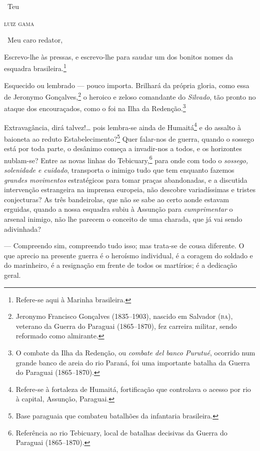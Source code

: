 \hfill\ Teu

\hfill\textsc{luiz gama}

\asterisc

\noindent\ Meu caro redator,

Escrevo-lhe às pressas, e escrevo-lhe para saudar um dos bonitos nomes
da esquadra brasileira.\footnote{Refere-se aqui à Marinha brasileira.}

Esquecido ou lembrado --- pouco importa. Brilhará da própria gloria, como
essa de Jeronymo Gonçalves,\footnote{Jeronymo Francisco Gonçalves
  (1835--1903), nascido em Salvador (\textsc{ba}), veterano da Guerra do Paraguai
  (1865--1870), fez carreira militar, sendo reformado como almirante.} o
heroico e zeloso comandante do \emph{Silvado}, tão pronto no ataque dos
encouraçados, como o foi na Ilha da Redenção.\footnote{O combate da
  Ilha da Redenção, ou \emph{combate del banco Purutué}, ocorrido num
  grande banco de areia do rio Paraná, foi uma importante batalha da
  Guerra do Paraguai (1865--1870).}

Extravagância, dirá talvez!\ldots{} pois lembra-se ainda de Humaitá\footnote{
  Refere-se à fortaleza de Humaitá, fortificação que controlava o acesso
  por rio à capital, Assunção, Paraguai.} e do assalto à baioneta ao
reduto Estabelecimento?\footnote{Base paraguaia que combateu batalhões
  da infantaria brasileira.} Quer falar-nos de guerra, quando o sossego
está por toda parte, o desânimo começa a invadir-nos a todos, e os
horizontes nublam-se? Entre as novas linhas do Tebicuary,\footnote{
  Referência ao rio Tebicuary, local de batalhas decisivas da Guerra do
  Paraguai (1865--1870).} para onde com todo o \emph{sossego, solenidade
e cuidado}, transporta o inimigo tudo que tem enquanto fazemos
\emph{grandes movimentos} estratégicos para tomar praças abandonadas, e
a discutida intervenção estrangeira na imprensa europeia, não descobre
variadíssimas e tristes conjecturas? As três bandeirolas, que não se
sabe ao certo aonde estavam erguidas, quando a nossa esquadra subiu à
Assunção para \emph{cumprimentar} o arsenal inimigo, não lhe parecem o
conceito de uma charada, que já vai sendo adivinhada?

--- Compreendo sim, compreendo tudo isso; mas trata-se de cousa
diferente. O que aprecio na presente guerra é o heroísmo individual, é a
coragem do soldado e do marinheiro, é a resignação em frente de todos os
martírios; é a dedicação geral.

